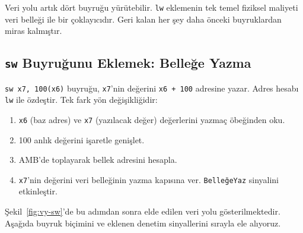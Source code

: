 Veri yolu artık dört buyruğu yürütebilir. \texttt{lw} eklemenin tek temel fiziksel maliyeti veri belleği ile bir çoklayıcıdır. Geri kalan her şey daha önceki buyruklardan miras kalmıştır.

\subsection{\texttt{sw} Buyruğunu Eklemek: Belleğe Yazma}
\label{subsec:vy-sw}

\texttt{sw x7, 100(x6)} buyruğu, \texttt{x7}'nin değerini \texttt{x6 + 100} adresine yazar. Adres hesabı \texttt{lw} ile özdeştir. Tek fark yön değişikliğidir:
\begin{enumerate}
    \item \texttt{x6} (baz adres) ve \texttt{x7} (yazılacak değer) değerlerini yazmaç öbeğinden oku.
    \item 100 anlık değerini işaretle genişlet.
    \item AMB'de toplayarak bellek adresini hesapla.
    \item \texttt{x7}'nin değerini veri belleğinin yazma kapısına ver. \texttt{BelleğeYaz} sinyalini etkinleştir.
\end{enumerate}

Şekil~\ref{fig:vy-sw}'de bu adımdan sonra elde edilen veri yolu gösterilmektedir. Aşağıda buyruk biçimini ve eklenen denetim sinyallerini sırayla ele alıyoruz.

